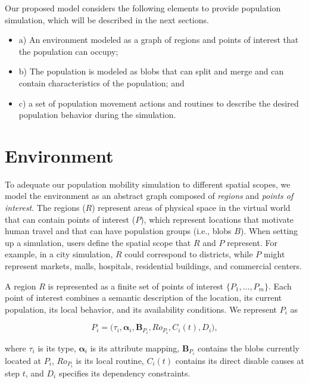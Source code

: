 Our proposed model considers the following elements to provide population simulation, which will be described in the next sections. 
\begin{itemize}
    \item a) An environment modeled as a graph of regions and points of interest that the population can occupy;
    \item b) The population is modeled as blobs that can split and merge and can contain characteristics of the population; and
    \item c) a set of population movement actions and routines to describe the desired population behavior during the simulation.
\end{itemize} 

\section{Environment}
\label{sec:environment}

To adequate our population mobility simulation to different spatial scopes, we model the environment as an abstract graph composed of \textit{regions} and \textit{points of interest}. The regions ($R$) represent areas of physical space in the virtual world that can contain points of interest ($P$), which represent locations that motivate human travel and that can have population groups (i.e., blobs $B$).
When setting up a simulation, users define the spatial scope that $R$ and $P$ represent. For example, in a city simulation, $R$ could correspond to districts, while $P$ might represent markets, malls, hospitals, residential buildings, and commercial centers.



\begingroup\color{red}
A region $R$ is represented as a finite set of points of interest $\{P_1,\ldots,P_m\}$. Each point of interest combines a semantic description of the location, its current population, its local behavior, and its availability conditions. We represent $P_i$ as

\begin{equation}
P_i=\bigl(\tau_i,\bm{\alpha}_i,\bm{B}_{P_i},Ro_{P_i},C_i(t),D_i\bigr),
\label{eq:poi_definition}
\end{equation}

where $\tau_i$ is its type, $\bm{\alpha}_i$ is its attribute mapping, $\bm{B}_{P_i}$ contains the blobs currently located at $P_i$, $Ro_{P_i}$ is its local routine, $C_i(t)$ contains its direct disable causes at step $t$, and $D_i$ specifies its dependency constraints.

